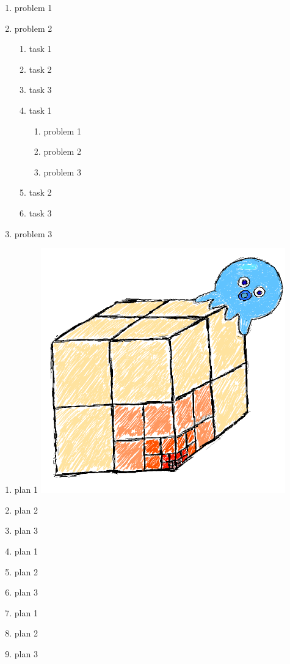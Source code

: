 \documentclass[chinese]{working}
\begin{document}
    \problem
    \begin{enumerate}
        \item problem 1
        \item problem 2
        \begin{enumerate}
            \item task 1
            \item task 2
            \item task 3
            \item task 1
            \begin{enumerate}
                \item problem 1
                \item problem 2
                \item problem 3
            \end{enumerate}
            \item task 2
            \item task 3
        \end{enumerate}
        \item problem 3
    \end{enumerate}
    \plan
    \begin{enumerate}
        \item plan 1
        \includegraphics{qinka}
        \item plan 2
        \item plan 3
        \item plan 1
        \item plan 2
        \item plan 3
        \item plan 1
        \item plan 2
        \item plan 3
    \end{enumerate}
\end{document}
